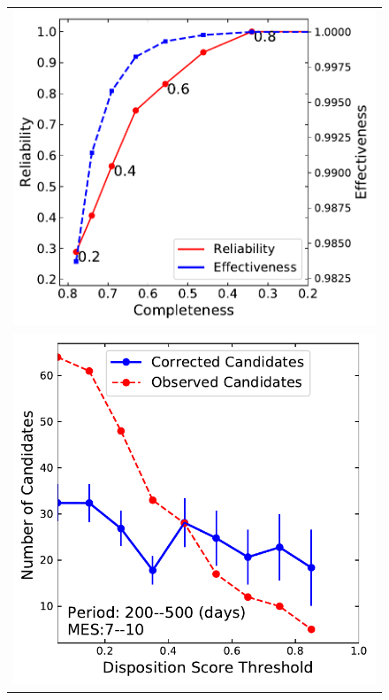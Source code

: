 \begin{figure}[htb]
 \begin{center}
 \begin{tabular}{c}
   \includegraphics[width=.98\linewidth]{f13-top.pdf} \\
  \includegraphics[width=.98\linewidth]{f13-bottom.pdf}

\end{tabular}
\end{center}
\end{figure}
